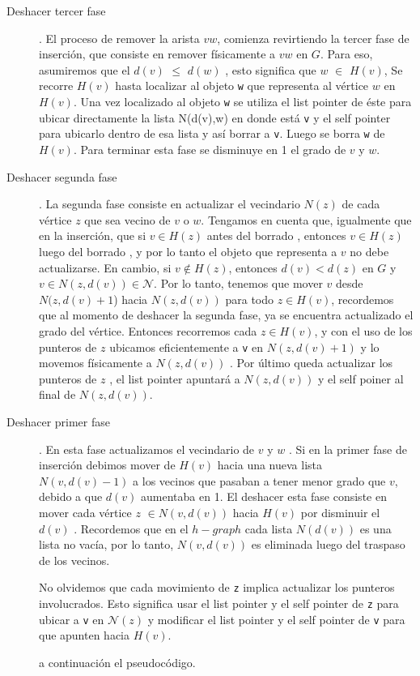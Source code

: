 \documentclass[a4paper,12pt]{article}
\newcommand{\N}{\mathcal{N}}
\begin{document}
\begin{description}
\item[Deshacer tercer fase]. El proceso de remover la arista  $vw$, comienza revirtiendo la tercer fase de inserción, que consiste en remover físicamente a $vw$ en $G$. Para eso,  asumiremos que el $d(v)$  ${\leq}$   $d(w)$ , esto significa que  $w$ ${\in}$ $H(v)$, Se recorre $H(v)$ hasta localizar al objeto  \texttt{w} que representa al vértice $w$ en $H(v)$. Una vez localizado al objeto \texttt{w} se utiliza el list pointer de éste para ubicar directamente la lista {N(d(v),w)} en donde está \texttt{v} y el self pointer para ubicarlo  dentro de esa lista y así borrar a \texttt{v}. Luego se borra \texttt{w} de $H(v)$.
Para terminar esta fase se disminuye en 1 el grado de $v$ y $w$.

\item[Deshacer segunda fase]. La segunda fase consiste en actualizar el vecindario $N(z)$ de cada vértice $z$ que sea vecino de $v$ o $w$.  Tengamos en cuenta que, igualmente que en la inserción,  que si $v \in H(z)$ antes del borrado , entonces $v \in H(z)$ luego del borrado , y por lo tanto el objeto que representa a $v$ no debe actualizarse.  En cambio, si $v \not\in H(z)$, entonces $d(v) < d(z)$ en $G$ y $v \in N(z, d(v)) \in \N$.  Por lo tanto, tenemos que mover $v$ desde $N(z,d(v) +1 $) hacia $N(z, d(v))$ para todo $z \in H(v)$, recordemos que al momento de deshacer la segunda fase, ya se encuentra actualizado el grado del vértice. Entonces recorremos cada $z \in H(v)$, y con el uso de los punteros de $z$  ubicamos eficientemente a \texttt{v} en $N(z,d(v)+1)$ y lo movemos físicamente a $N(z,d(v))$ . Por último queda actualizar los punteros de $z$ , el list pointer apuntará a $N(z,d(v))$ y el self poiner al final de $N(z,d(v))$.


\item[Deshacer primer fase]. En esta fase actualizamos el vecindario de $v$ y $w$ . Si en la primer fase de inserción debimos mover de $H(v)$  hacia una nueva lista $N(v,d(v)-1)$  a los vecinos que pasaban a tener menor grado que $v$, debido a que $d(v)$ aumentaba en 1. El deshacer esta fase consiste en mover cada  vértice $z$ $\in N(v,d(v))$  hacia $H(v)$ por disminuir el $d(v)$ . Recordemos que en el $h-graph$  cada lista $N(d(v)) $ es una lista no vacía, por lo tanto, $N(v,d(v))$ es eliminada luego del traspaso de los vecinos.

No olvidemos que cada movimiento de \texttt{z} implica actualizar los punteros involucrados. Esto significa usar  el list pointer y el self pointer de \texttt{z} para ubicar a \texttt{v} en $\N(z)$ y modificar el list pointer y el self pointer de \texttt{v} para que apunten hacia $H(v)$.

a continuación el pseudocódigo.
\end{description}
\end{document}
